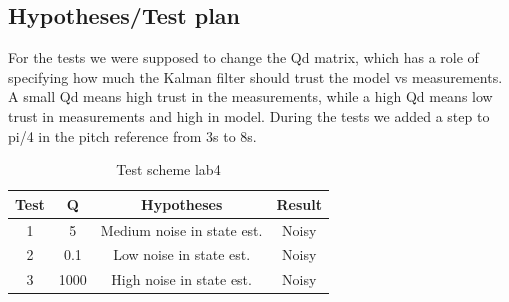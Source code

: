 \subsection{Hypotheses/Test plan}
For the tests we were supposed to change the Qd matrix, which has a role of specifying how much the Kalman filter should trust the model vs measurements. A small Qd 
means high trust in the measurements, while a high Qd means low trust in measurements and high in model. 
During the tests we added a step to pi/4 in the pitch reference from 3s to 8s. 
\begin{table}[h]
    \centering
        \begin{tabular}{||c c c c||} 
         \hline
         Test & Q  & Hypotheses & Result \\ [0.5ex] 
         \hline\hline
         1 & 5 & Medium noise in state est. & Noisy \\ 
         \hline
         2 & 0.1 & Low noise in state est. & Noisy \\
         \hline
         3 & 1000 & High noise in state est. & Noisy  \\ [1ex]
         \hline
        \end{tabular}
        \label{tab:testskjema_lab4}
        \caption{Test scheme lab4}
    \end{table}
